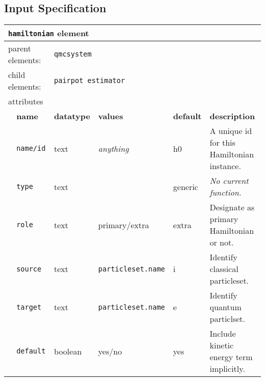 \subsection{Input Specification}



\begin{table}[h]
\begin{center}
\begin{tabularx}{\textwidth}{l l l l l l }
\hline
\multicolumn{6}{l}{\texttt{hamiltonian} element} \\
\hline
\multicolumn{2}{l}{parent elements:} & \multicolumn{4}{l}{\texttt{qmcsystem}}\\
\multicolumn{2}{l}{child  elements:} & \multicolumn{4}{l}{\texttt{pairpot estimator}}\\
\multicolumn{2}{l}{attributes}  & \multicolumn{4}{l}{}\\
   &   \bfseries name     & \bfseries datatype & \bfseries values & \bfseries default   & \bfseries description \\
   &   \texttt{name/id}   &  text              & \textit{anything}& h0                  & A unique id for this Hamiltonian instance.                      \\
   &   \texttt{type   }   &  text              &                  & generic             & \textit{No current function.}                      \\
   &   \texttt{role   }   &  text              & primary/extra    & extra               & Designate as primary Hamiltonian or not.                      \\
   &   \texttt{source }   &  text              & \texttt{particleset.name} & i          & Identify classical particleset.                      \\
   &   \texttt{target }   &  text              & \texttt{particleset.name} & e          & Identify quantum particlset.                      \\
   &   \texttt{default}   &  boolean           & yes/no           & yes                 & Include kinetic energy term implicitly.                      \\
  \hline
\end{tabularx}
\end{center}
\end{table}




